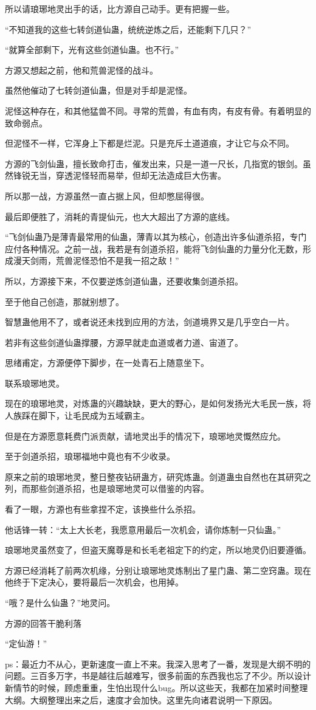 \begin{this_body}
所以请琅琊地灵出手的话，比方源自己动手。更有把握一些。

“不知道我的这些七转剑道仙蛊，统统逆炼之后，还能剩下几只？”

“就算全部剩下，光有这些剑道仙蛊。也不行。”

方源又想起之前，他和荒兽泥怪的战斗。

虽然他催动了七转剑道仙蛊，但是对手却是泥怪。

泥怪这种存在，和其他猛兽不同。寻常的荒兽，有血有肉，有皮有骨。有着明显的致命弱点。

但泥怪不一样，它浑身上下都是烂泥。只是充斥土道道痕，才让它与众不同。

方源的飞剑仙蛊，擅长致命打击，催发出来，只是一道一尺长，几指宽的银剑。虽然锋锐无当，穿透泥怪轻而易举，但却无法造成巨大伤害。

所以那一战，方源虽然一直占据上风，但却憋屈得很。

最后即便胜了，消耗的青提仙元，也大大超出了方源的底线。

“飞剑仙蛊乃是薄青最常用的仙蛊，薄青以其为核心，创造出许多仙道杀招，专门应付各种情况。之前一战，我若是有剑道杀招，能将飞剑仙蛊的力量分化无数，形成漫天剑雨，荒兽泥怪恐怕不是我一招之敌！”

所以，方源接下来，不仅要逆炼剑道仙蛊，还要收集剑道杀招。

至于他自己创造，那就别想了。

智慧蛊他用不了，或者说还未找到应用的方法，剑道境界又是几乎空白一片。

若非有这些剑道仙蛊撑腰，方源早就走血道或者力道、宙道了。

思绪甫定，方源便停下脚步，在一处青石上随意坐下。

联系琅琊地灵。

现在的琅琊地灵，对炼蛊的兴趣缺缺，更大的野心，是如何发扬光大毛民一族，将人族踩在脚下，让毛民成为五域霸主。

但是在方源愿意耗费门派贡献，请地灵出手的情况下，琅琊地灵慨然应允。

至于剑道杀招，琅琊福地中竟也有不少收录。

原来之前的琅琊地灵，整日整夜钻研蛊方，研究炼蛊。剑道蛊虫自然也在其研究之列，而那些剑道杀招，也是琅琊地灵可以借鉴的内容。

看了一眼，方源也有些拿捏不定，该换些什么杀招。

他话锋一转：“太上大长老，我愿意用最后一次机会，请你炼制一只仙蛊。”

琅琊地灵虽然变了，但盗天魔尊是和长毛老祖定下的约定，所以地灵仍旧要遵循。

方源已经消耗了前两次机缘，分别让琅琊地灵炼制出了星门蛊、第二空窍蛊。现在他终于下定决心，要将最后一次机会，也用掉。

“哦？是什么仙蛊？”地灵问。

方源的回答干脆利落

“定仙游！”

ps：最近力不从心，更新速度一直上不来。我深入思考了一番，发现是大纲不明的问题。三百多万字，书是越往后越难写，很多前面的东西我也忘了不少。所以设计新情节的时候，顾虑重重，生怕出现什么bug。所以这些天，我都在加紧时间整理大纲。大纲整理出来之后，速度才会加快。这里先向诸君说明一下原因。

\end{this_body}

